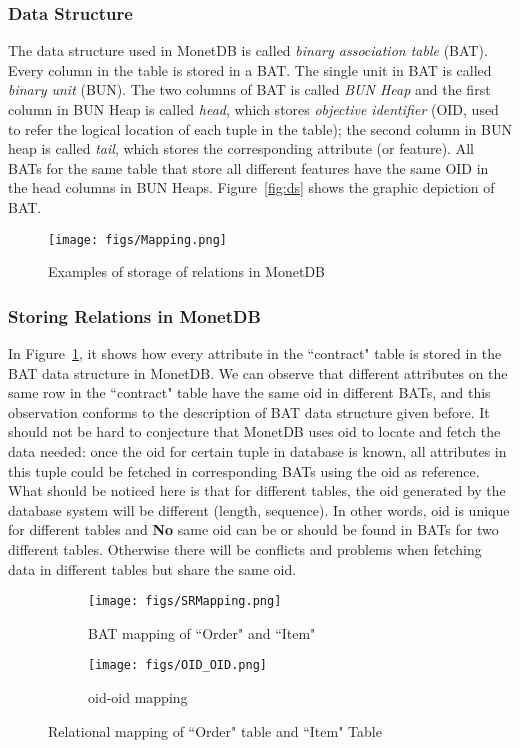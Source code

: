 \documentclass{vldb}
\begin{document}
\subsubsection{Data Structure}
The data structure used in MonetDB is called \textit{binary association table} (BAT). Every column in the table is stored in a BAT. The single unit in BAT
is called \textit{binary unit} (BUN). The two columns of BAT is called \textit{BUN Heap} and the first column in BUN Heap is called \textit{head}, which 
stores \textit{objective identifier} (OID, used to refer the logical location of each tuple in the table); the second column in BUN heap is called \textit{tail}, which stores
the corresponding attribute (or feature). All BATs for the same table that store all different features have the same OID in the head columns in BUN Heaps.
Figure~\ref{fig:ds} shows the graphic depiction of BAT. 

\begin{figure}[H]
\centering
{\texttt{[image: figs/Mapping.png]}}
\caption{Examples of storage of relations in MonetDB}
\label{fig:relation}
\end{figure}

\subsubsection{Storing Relations in MonetDB}
In Figure~\ref{fig:relation}, it shows how every attribute in the ``contract" table is stored in the BAT data structure in MonetDB. We can observe that different attributes 
on the same row in the ``contract" table have the same oid in different BATs, and this observation conforms to the description of BAT data structure given before. 
It should not be hard to conjecture that MonetDB uses oid to locate and fetch the data needed: once the oid for certain tuple in database
is known, all attributes in this tuple could be fetched in corresponding BATs using the oid as reference. What should be noticed here is that for different tables, 
the oid generated by the database system will be different (length, sequence). In other words, oid is unique for different tables and \textbf{No} same oid
can be or should be found in BATs for two different tables. Otherwise there will be conflicts and problems when fetching data in different tables but share the same oid.

\begin{figure}[H]
\centering
\begin{subfigure}{0.5\textwidth}
  \centering
  \texttt{[image: figs/SRMapping.png]}
  \caption{BAT mapping of ``Order" and ``Item"}
\end{subfigure}
\begin{subfigure}{0.4\textwidth}
  \centering
  \texttt{[image: figs/OID\_OID.png]}
  \caption{oid-oid mapping}
\end{subfigure}
\caption{Relational mapping of ``Order" table and ``Item" Table}
\label{fig:relation example}
\end{figure}
\end{document}
